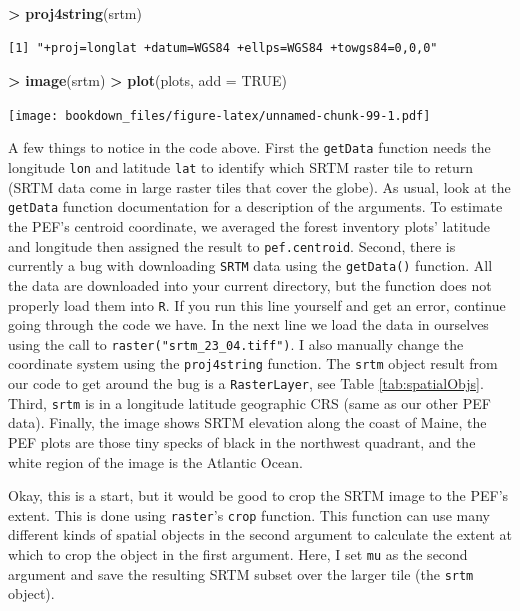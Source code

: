 \documentclass[]{krantz}
\makeatletter
\newenvironment{Shaded}{\begin{snugshade}}{\end{snugshade}}
\newcommand{\DataTypeTok}[1]{\textcolor[rgb]{0.27,0.27,0.27}{#1}}
\newcommand{\KeywordTok}[1]{\textcolor[rgb]{0.27,0.27,0.27}{\textbf{#1}}}
\newcommand{\NormalTok}[1]{#1}
\newcommand{\OperatorTok}[1]{\textcolor[rgb]{0.43,0.43,0.43}{\textbf{#1}}}
\newcommand{\OtherTok}[1]{\textcolor[rgb]{0.37,0.37,0.37}{#1}}
\newcommand{\StringTok}[1]{\textcolor[rgb]{0.5,0.5,0.5}{#1}}
\newenvironment{kframe}{%
\medskip{}
\setlength{\fboxsep}{.8em}
 \def\at@end@of@kframe{}%
 \ifinner\ifhmode%
  \def\at@end@of@kframe{\end{minipage}}%
  \begin{minipage}{\columnwidth}%
 \fi\fi%
 \def\FrameCommand##1{\hskip\@totalleftmargin \hskip-\fboxsep
 \colorbox{shadecolor}{##1}\hskip-\fboxsep
     \hskip-\linewidth \hskip-\@totalleftmargin \hskip\columnwidth}%
 \MakeFramed {\advance\hsize-\width
   \@totalleftmargin\z@ \linewidth\hsize
   \@setminipage}}%
 {\par\unskip\endMakeFramed%
 \at@end@of@kframe}
\renewenvironment{Shaded}{\begin{kframe}}{\end{kframe}}
\makeatother
\begin{document}
\begin{Shaded}
\begin{Highlighting}[]
\OperatorTok{>}\StringTok{ }\KeywordTok{proj4string}\NormalTok{(srtm)}
\end{Highlighting}
\end{Shaded}

\begin{verbatim}
[1] "+proj=longlat +datum=WGS84 +ellps=WGS84 +towgs84=0,0,0"
\end{verbatim}

\begin{Shaded}
\begin{Highlighting}[]
\OperatorTok{>}\StringTok{ }\KeywordTok{image}\NormalTok{(srtm)}
\OperatorTok{>}\StringTok{ }\KeywordTok{plot}\NormalTok{(plots, }\DataTypeTok{add =} \OtherTok{TRUE}\NormalTok{)}
\end{Highlighting}
\end{Shaded}

\texttt{[image: bookdown\_files/figure-latex/unnamed-chunk-99-1.pdf]}

A few things to notice in the code above. First the \texttt{getData} function needs the longitude \texttt{lon} and latitude \texttt{lat} to identify which SRTM raster tile to return (SRTM data come in large raster tiles that cover the globe). As usual, look at the \texttt{getData} function documentation for a description of the arguments. To estimate the PEF's centroid coordinate, we averaged the forest inventory plots' latitude and longitude then assigned the result to \texttt{pef.centroid}. Second, there is currently a bug with downloading \texttt{SRTM} data using the \texttt{getData()} function. All the data are downloaded into your current directory, but the function does not properly load them into \texttt{R}. If you run this line yourself and get an error, continue going through the code we have. In the next line we load the data in ourselves using the call to \texttt{raster("srtm\_23\_04.tiff")}. I also manually change the coordinate system using the \texttt{proj4string} function. The \texttt{srtm} object result from our code to get around the bug is a \texttt{RasterLayer}, see Table \ref{tab:spatialObjs}. Third, \texttt{srtm} is in a longitude latitude geographic CRS (same as our other PEF data). Finally, the image shows SRTM elevation along the coast of Maine, the PEF plots are those tiny specks of black in the northwest quadrant, and the white region of the image is the Atlantic Ocean.

Okay, this is a start, but it would be good to crop the SRTM image to the PEF's extent. This is done using \texttt{raster}'s \texttt{crop} function. This function can use many different kinds of spatial objects in the second argument to calculate the extent at which to crop the object in the first argument. Here, I set \texttt{mu} as the second argument and save the resulting SRTM subset over the larger tile (the \texttt{srtm} object).
\end{document}
